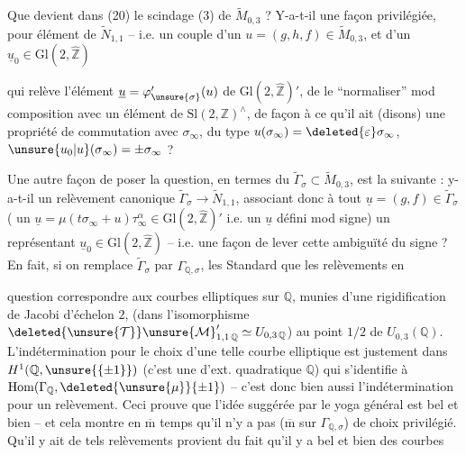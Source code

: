 Que devient dans (20) le scindage (3) de $\widetilde{M}_{0,3}$ ? Y-a-t-il une façon privilégiée, pour  élément de $\widetilde{N}_{1,1}$ -- i.e. un couple d'un $u=(g,h,f)\in\widetilde{M}_{0,3}$, et d'un $\underline{u}_0\in\mathrm{Gl}(2,\widehat{\mathbb Z})$


qui relève l'élément $\underline{u}=\varphi'_{\unsure{\sigma}}(u)$ de $\mathrm{Gl}(2,\widehat{\mathbb Z})'$, de le ``normaliser'' mod  composition avec un élément de $\mathrm{Sl}(2,\mathbb Z)^\wedge$, de façon à ce qu'il ait  (disons) une propriété de commutation avec $\sigma_\infty$, du type $u(\sigma_\infty)=\deleted{\varepsilon}\sigma_\infty$,  $\unsure{u_0|u}(\sigma_\infty)=\pm\sigma_\infty$ ?

Une autre façon de poser la question, en termes du  $\widetilde{\Gamma}_\sigma\subset\widetilde{M}_{0,3}$, est la suivante : y-a-t-il un relèvement canonique $\widetilde{\Gamma}_\sigma\longrightarrow\widetilde{N}_{1,1}$, associant donc à tout $\underline{u}=(g,f)\in\widetilde{\Gamma}_\sigma$ ( un $\underline{u}=\mu(t\sigma_\infty+u)\tau_\infty^\alpha\in\mathrm{Gl}(2,\widehat{\mathbb Z})'$\unsure{,|\}}  i.e. un $\underline{u}$ défini mod signe) un représentant $\underline{u}_0\in\mathrm{Gl}(2,\widehat{\mathbb Z})$ -- i.e. une façon de lever cette ambiguïté du signe ? En fait, si on remplace $\widetilde{\Gamma}_\sigma$ par $\Gamma_{\mathbb Q,\sigma}$, les  Standard  que les relèvements en


question  correspondre aux courbes elliptiques sur $\mathbb Q$, munies d'une rigidification de Jacobi d'échelon $2$,  (dans l'isomorphisme $\deleted{\unsure{\mathcal T}}\unsure{\mathcal M}_{1,1\,\mathbb Q}'\simeq U_{0,3\,\mathbb Q}$) au point $1/2$ de $U_{0,3}(\mathbb Q)$. L'indétermination pour le choix d'une telle courbe elliptique est justement dans $H^1(\mathbb Q,\unsure{\{\pm1\}})$ (c'est une  d'ext. quadratique  $\mathbb Q$) qui s'identifie à $\mathrm{Hom}(\Gamma_{\mathbb Q},\deleted{\unsure{\mu}}\{\pm1\})$ -- c'est donc bien aussi l'indétermination pour un relèvement. Ceci prouve  que l'idée suggérée par le yoga général est bel et bien  -- et cela montre en $\overline{\mathrm m}$ temps qu'il n'y a pas ($\overline{\mathrm m}$ sur $\Gamma_{\mathbb Q,\sigma}$) de choix  privilégié. Qu'il y ait de tels relèvements  provient du fait qu'il y a bel et bien des courbes

